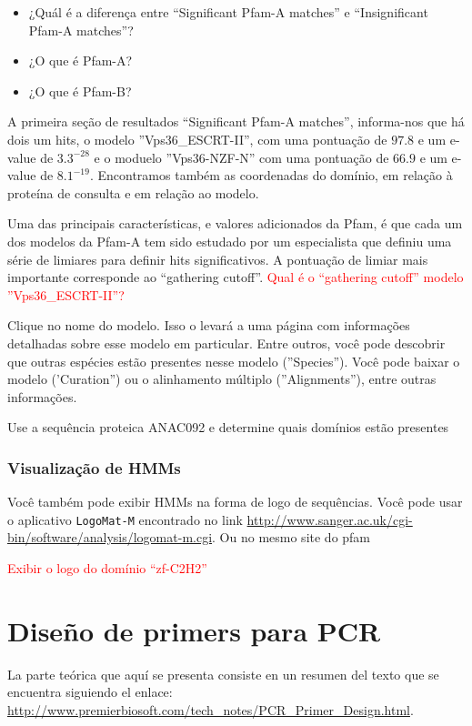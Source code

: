 \documentclass[letter,11pt]{book}
\begin{document}
{\color{red}
\begin{itemize}
\item ¿Quál é a diferença entre ``Significant Pfam-A matches'' e ``Insignificant Pfam-A matches''?
\item ¿O que é Pfam-A? 
\item ¿O que é Pfam-B?
\end{itemize}
}

A primeira seção de resultados ``Significant Pfam-A matches'', informa-nos que há dois um hits, o modelo ''Vps36\_ESCRT-II'', com uma pontuação de $97.8$ e um e-value de $3.3^{-28}$ e o moduelo  ''Vps36-NZF-N'' com uma pontuação de $66.9$ e um e-value de $8.1^{-19}$. Encontramos também as coordenadas do domínio, em relação à proteína de consulta e em relação ao modelo.

Uma das principais características, e valores adicionados da Pfam, é que cada um dos modelos da Pfam-A tem sido estudado por um especialista que definiu uma série de limiares para definir hits significativos. A pontuação de limiar mais importante corresponde ao ``gathering cutoff''. \textcolor{red}{Qual é o ``gathering cutoff'' modelo ''Vps36\_ESCRT-II''?}

Clique no nome do modelo. Isso o levará a uma página com informações detalhadas sobre esse modelo em particular. Entre outros, você pode descobrir que outras espécies estão presentes nesse modelo (''Species''). Você pode baixar o modelo ('Curation'') ou o alinhamento múltiplo (''Alignments''), entre outras informações.

{\color{red}
Use a sequência proteica ANAC092 e determine quais domínios estão presentes}

\subsection{Visualização de HMMs}

Você também pode exibir HMMs na forma de logo de sequências. Você pode usar o aplicativo \Verb+LogoMat-M+ encontrado no link \url{http://www.sanger.ac.uk/cgi-bin/software/analysis/logomat-m.cgi}. Ou no mesmo site do pfam

\textcolor{red}{Exibir o logo do domínio ``zf-C2H2''}

\chapter{Diseño de primers para PCR}

La parte teórica que aquí se presenta consiste en un resumen del texto que se encuentra siguiendo el enlace: \url{http://www.premierbiosoft.com/tech_notes/PCR_Primer_Design.html}.
\end{document}
